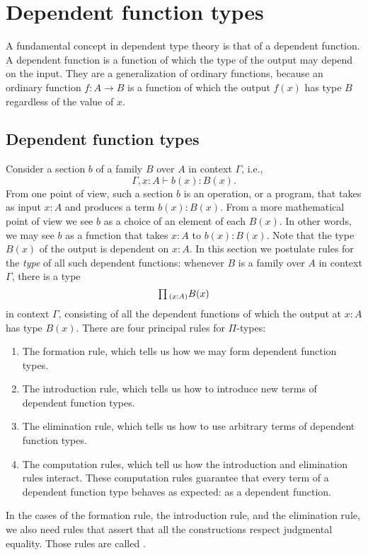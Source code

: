\section{Dependent function types}
\label{ch:pi}

A fundamental concept in dependent type theory is that of a dependent function. A dependent function is a function of which the type of the output may depend on the input. They are a generalization of ordinary functions, because an ordinary function $f:A\to B$ is a function of which the output $f(x)$ has type $B$ regardless of the value of $x$.

\subsection{Dependent function types}
Consider a section $b$ of a family $B$ over $A$ in context $\Gamma$, i.e.,
\begin{equation*}
  \Gamma,x:A\vdash b(x):B(x).
\end{equation*}
From one point of view, such a section $b$ is an operation, or a program, that takes as input $x:A$ and produces a term $b(x):B(x)$. From a more mathematical point of view we see $b$ as a choice of an element of each $B(x)$. In other words, we may see $b$ as a function that takes $x:A$ to $b(x):B(x)$. Note that the type $B(x)$ of the output is dependent on $x:A$. In this section we postulate rules for the \emph{type} of all such dependent functions: whenever $B$ is a family over $A$ in context $\Gamma$, there is a type
\begin{equation*}
  \prd{x:A}B(x)
\end{equation*}
in context $\Gamma$, consisting of all the dependent functions of which the output at $x:A$ has type $B(x)$. There are four principal rules for $\Pi$-types:
\begin{enumerate}
\item The formation rule, which tells us how we may form dependent function types.
\item The introduction rule, which tells us how to introduce new terms of dependent function types.
\item The elimination rule, which tells us how to use arbitrary terms of dependent function types.
\item The computation rules, which tell us how the introduction and elimination rules interact. These computation rules guarantee that every term of a dependent function type behaves as expected: as a dependent function.
\end{enumerate}
In the cases of the formation rule, the introduction rule, and the elimination rule, we also need rules that assert that all the constructions respect judgmental equality. Those rules are called .


